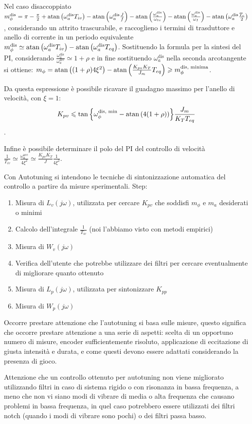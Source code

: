 Nel caso disaccoppiato \(m_\phi^\text{dis} = \pi - \frac{\pi}{2} + \operatorname{atan}\left( \omega_a^\text{dis} T_{iv} \right) - \operatorname{atan}\left( \omega_a^\text{dis} \frac{J}{f} \right) - \operatorname{atan}\left( \frac{\omega_a^\text{dis}}{\omega_{tv}} \right) - \operatorname{atan}\left( \frac{\omega_a^\text{dis}}{\omega_I} \right) - \operatorname{atan}\left( \omega_a^\text{dis} \frac{T_c}{2} \right) \), considerando un attrito trascurabile, e raccoglieno i termini di trasduttore e anello di corrente in un periodo equivalente \(m_\phi^\text{dis} \simeq \operatorname{atan}\left( \omega_a^\text{dis} T_{iv} \right) - \operatorname{atan}\left( \omega_a^\text{dis} T_{eq} \right) \). Sostituendo la formula per la sintesi del PI, considerando \(\frac{\omega_a^\text{dis}}{\omega_a^\text{acc}} \simeq 1+\rho\) e in fine sostituendo \(\omega_a^\text{dis}\) nella seconda arcotangente si ottiene: \(m_\phi = \operatorname{atan}\left( (1+\rho) 4 \xi^2 \right) - \operatorname{atan}\left( \frac{K_{pv}K_T}{J_m} T_{eq} \right) \geqslant m_\phi^\text{dis, minima}\).

Da questa espressione è possibile ricavare il guadagno massimo per l'anello di velocità, con \(\xi=1\): \[K_{pv} \leqslant \tan{\left\{\omega_\phi^\text{dis, min} - \operatorname{atan}\left( 4(1+\rho) \right) \right\}}\frac{J_m}{K_T T_{eq}} \].

Infine è possibile determinare il polo del PI del controllo di velocità \(\frac{1}{T_{iv}} \simeq \frac{\omega_a^\text{acc}}{4\xi^2} \simeq \frac{K_{pv}K_T}{J} \frac{1}{4\xi^2} \).

Con Autotuning si intendono le tecniche di sintonizzazione automatica del controllo a partire da misure sperimentali.
Step:
\begin{enumerate}
    \item Misura di \(L_v(j\omega)\), utilizzata per cercare \(K_{pv}\) che soddisfi \(m_\phi\) e \(m_a\) desiderati o minimi
    \item Calcolo dell'integrale \(\frac{1}{T_{iv}}\) (noi l'abbiamo visto con metodi empirici)
    \item Misura di \(W_v(j\omega)\)
    \item Verifica dell'utente che potrebbe utilizzare dei filtri per cercare eventualmente di migliorare quanto ottenuto
    \item Misura di \(L_p(j\omega)\), utilizzata per sintonizzare \(K_{pp}\)
    \item Misura di \(W_p(j\omega)\)
\end{enumerate}

Occorre prestare attenzione che l'autotuning si basa sulle misure, questo significa che occorre prestare attenzione a una serie di aspetti: scelta di un opportuno numero di misure, encoder sufficientemente risoluto, applicazione di eccitazione di giusta intensità e durata, e come questi devono essere adattati considerando la presenza di gioco.

Attenzione che un controllo ottenuto per autotuning non viene migliorato utilizzando filtri in caso di sistema rigido o con risonanza in bassa frequenza, a meno che non vi siano modi di vibrare di media o alta frequenza che causano problemi in bassa frequenza, in quel caso potrebbero essere utilizzati dei filtri notch (quando i modi di vibrare sono pochi) o dei filtri passa basso.